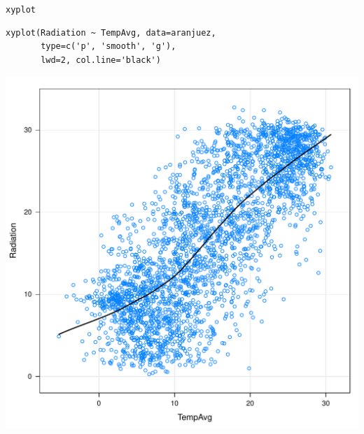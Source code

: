 \documentclass[xcolor={usenames,svgnames,dvipsnames}]{beamer}
\begin{document}
\begin{frame}[fragile,label=sec-2-1-5]{\texttt{xyplot}}
 \lstset{language=R,numbers=none}
\begin{lstlisting}
xyplot(Radiation ~ TempAvg, data=aranjuez,
       type=c('p', 'smooth', 'g'),
       lwd=2, col.line='black')
\end{lstlisting}

\includegraphics[width=.9\linewidth]{figs/xyplotSmooth.pdf}
\end{frame}
\end{document}
